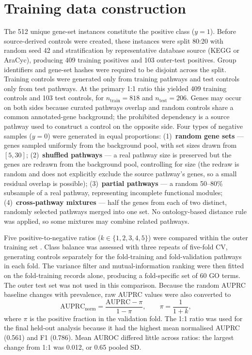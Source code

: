 \documentclass[12pt,letterpaper,oneside,openany]{book}
\begin{document}
\section{Training data construction}
\label{sec:dataset}

The 512 unique gene-set instances constitute the positive class ($y = 1$). Before source-derived controls were created, these instances were split 80:20 with random seed 42 and stratification by representative database source (KEGG or AraCyc), producing 409 training positives and 103 outer-test positives. Group identifiers and gene-set hashes were required to be disjoint across the split. Training controls were generated only from training pathways and test controls only from test pathways. At the primary 1:1 ratio this yielded 409 training controls and 103 test controls, for $n_{\mathrm{train}}=818$ and $n_{\mathrm{test}}=206$. Genes may occur on both sides because curated pathways overlap and random controls share a common annotated-gene background; the prohibited dependency is a source pathway used to construct a control on the opposite side.
Four types of negative samples ($y = 0$) were generated in equal proportions:
(1)~\textbf{random gene sets} --- genes sampled uniformly from the background pool, with set sizes drawn from $[5,30]$;
(2)~\textbf{shuffled pathways} --- a real pathway size is preserved but the genes are redrawn from the background pool, controlling for size (the redraw is random and does not explicitly exclude the source pathway's genes, so a small residual overlap is possible);
(3)~\textbf{partial pathways} --- a random 50--80\% subsample of a real pathway, representing incomplete functional modules;
(4)~\textbf{cross-pathway mixtures} --- half the genes from each of two distinct, randomly selected pathways merged into one set. No ontology-based distance rule was applied, so some mixtures may combine related pathways.

Five positive-to-negative ratios ($k \in \{1,2,3,4,5\}$) were compared within the outer training set \citep{japkowicz2002class}. Class balance was assessed with three repeats of five-fold CV, generating controls separately for the fold-training and fold-validation pathways in each fold. The variance filter and mutual-information ranking were then fitted on the fold-training records alone, producing a fold-specific set of 60 GO terms. The outer test set was not used in this comparison. Because the random AUPRC baseline changes with prevalence, raw AUPRC values were also converted to
\begin{equation}
\mathrm{AUPRC}_{\mathrm{norm}} =
\frac{\mathrm{AUPRC}-\pi}{1-\pi}, \qquad \pi=\frac{1}{1+k},
\label{eq:normalized_auprc}
\end{equation}
where $\pi$ is the positive fraction in the validation fold. The 1:1 ratio was used for the final held-out analysis because it had the highest mean normalised AUPRC (0.561) and F1 (0.786). Mean AUROC differed little across ratios: the largest change from 1:1 was 0.012, or 0.65 pooled SD.
\end{document}
